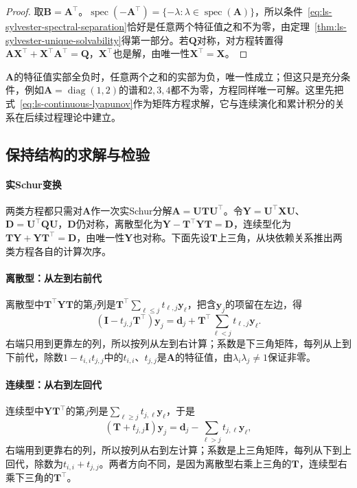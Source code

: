 \begin{proof}
取$\bm B=\bm A^\top$。$\operatorname{spec}(-\bm A^\top)=\{-\lambda:\lambda\in\operatorname{spec}(\bm A)\}$，所以条件~\eqref{eq:ls-sylvester-spectral-separation}恰好是任意两个特征值之和不为零，由定理~\ref{thm:ls-sylvester-unique-solvability}得第一部分。若$\bm Q$对称，对方程转置得$\bm A\bm X^\top+\bm X^\top\bm A^\top=\bm Q$，$\bm X^\top$也是解，由唯一性$\bm X^\top=\bm X$。
\end{proof}

$\bm A$的特征值实部全负时，任意两个之和的实部为负，唯一性成立；但这只是充分条件，例如$\bm A=\operatorname{diag}(1,2)$的谱和$2,3,4$都不为零，方程同样唯一可解。这里先把式~\eqref{eq:ls-continuous-lyapunov}作为矩阵方程求解，它与连续演化和累计积分的关系在后续过程理论中建立。

\subsection{保持结构的求解与检验}
\label{sec:ls-lyapunov-solve}

\paragraph{实Schur变换}
两类方程都只需对$\bm A$作一次实Schur分解$\bm A=\bm U\bm T\bm U^\top$。令$\bm Y=\bm U^\top\bm X\bm U$、$\bm D=\bm U^\top\bm Q\bm U$，$\bm D$仍对称，离散型化为$\bm Y-\bm T^\top\bm Y\bm T=\bm D$，连续型化为$\bm T\bm Y+\bm Y\bm T^\top=\bm D$，由唯一性$\bm Y$也对称。下面先设$\bm T$上三角，从块依赖关系推出两类方程各自的计算次序。

\paragraph{离散型：从左到右前代}
离散型中$\bm T^\top\bm Y\bm T$的第$j$列是$\bm T^\top\sum_{\ell\leq j}t_{\ell,j}\bm y_\ell$，把含$\bm y_j$的项留在左边，得
\[
 (\bm I-t_{j,j}\bm T^\top)\bm y_j=\bm d_j+\bm T^\top\sum_{\ell<j}t_{\ell,j}\bm y_\ell .
\]
右端只用到更靠左的列，所以按列从左到右计算；系数是下三角矩阵，每列从上到下前代，除数$1-t_{i,i}t_{j,j}$中的$t_{i,i}$、$t_{j,j}$是$\bm A$的特征值，由$\lambda_i\lambda_j\neq1$保证非零。

\paragraph{连续型：从右到左回代}
连续型中$\bm Y\bm T^\top$的第$j$列是$\sum_{\ell\geq j}t_{j,\ell}\bm y_\ell$，于是
\[
 (\bm T+t_{j,j}\bm I)\bm y_j=\bm d_j-\sum_{\ell>j}t_{j,\ell}\bm y_\ell ,
\]
右端用到更靠右的列，所以按列从右到左计算；系数是上三角矩阵，每列从下到上回代，除数为$t_{i,i}+t_{j,j}$。两者方向不同，是因为离散型右乘上三角的$\bm T$，连续型右乘下三角的$\bm T^\top$。

